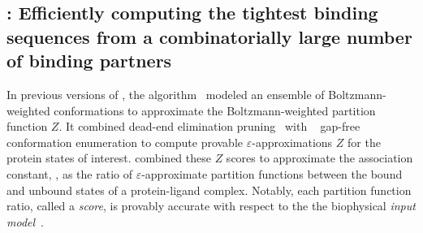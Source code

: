 \def\multisequencebound{MS\xspace}
\def\msbound{\multisequencebound}


\def\submissionMode{0}

\newcommand{\cut}[1]{}

\subsection{\bbks: Efficiently computing the tightest binding sequences from a combinatorially large number of binding partners}
\cut{Although many GMEC-based designs predict sequences which fold and even bind the desired target, proteins do not exist in nature as a single static structure, but instead as thermodynamic ensemble of structures. Protein design algorithms that optimize binding affinity search for sequences whose thermodynamic ensemble energetically favor the desired bound or unbound states over other undesirable states. In doing so, these algorithms search for sequences whose conformational ensemble may contain multiple low-energy conformations in the desired state. Algorithms whose input model accounts for the ensemble-nature of proteins more accurately represent protein flexibility, and can identify sequences with multiple low-energy conformations which GMEC-based algorithms do not model, and would thus overlook.}
In previous versions of \osprey, the \ks algorithm~\cite{} modeled an ensemble of Boltzmann-weighted conformations to approximate the Boltzmann-weighted partition function $Z$. It combined dead-end elimination pruning~\cite{} with \as~\cite{} gap-free conformation enumeration to compute provable $\varepsilon$-approximations $Z$ for the protein states of interest. \ks combined these $Z$ scores to approximate the association constant, \ka, as the ratio of $\varepsilon$-approximate partition functions between the bound and unbound states of a protein-ligand complex. Notably, each partition function ratio, called a \ks \emph{score}, is provably accurate with respect to the the biophysical \emph{input model}~\cite{}. 
%
\cut{The input model defines the set of allowed amino acid mutations (i.e.~the \emph{sequence space}), structural search space (i.e.~the input structures, and allowed protein flexibility), the optimization objective (e.g.~design for binding affinity), and the energy function~\cite{}.} 
%
